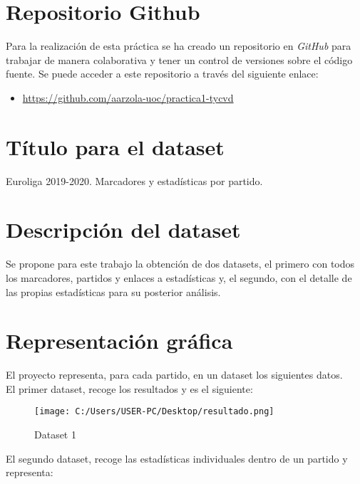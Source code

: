 \documentclass[]{article}
\providecommand{\tightlist}{%
  \setlength{\itemsep}{0pt}\setlength{\parskip}{0pt}}
\begin{document}
\hypertarget{repositorio-github}{%
\section{Repositorio Github}\label{repositorio-github}}

Para la realización de esta práctica se ha creado un repositorio en
\emph{GitHub} para trabajar de manera colaborativa y tener un control de
versiones sobre el código fuente. Se puede acceder a este repositorio a
través del siguiente enlace:

\begin{itemize}
\tightlist
\item
  \url{https://github.com/aarzola-uoc/practica1-tycvd}
\end{itemize}

\hypertarget{tuxedtulo-para-el-dataset}{%
\section{Título para el dataset}\label{tuxedtulo-para-el-dataset}}

Euroliga 2019-2020. Marcadores y estadísticas por partido.

\hypertarget{descripciuxf3n-del-dataset}{%
\section{Descripción del dataset}\label{descripciuxf3n-del-dataset}}

Se propone para este trabajo la obtención de dos datasets, el primero
con todos los marcadores, partidos y enlaces a estadísticas y, el
segundo, con el detalle de las propias estadísticas para su posterior
análisis.

\hypertarget{representaciuxf3n-gruxe1fica}{%
\section{Representación gráfica}\label{representaciuxf3n-gruxe1fica}}

El proyecto representa, para cada partido, en un dataset los siguientes
datos.\\
El primer dataset, recoge los resultados y es el siguiente:

\begin{figure}
\centering
\texttt{[image: C:/Users/USER-PC/Desktop/resultado.png]}
\caption{Dataset 1}
\end{figure}

El segundo dataset, recoge las estadísticas individuales dentro de un
partido y representa:
\end{document}
